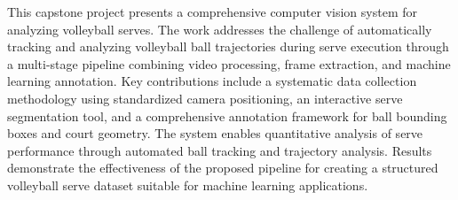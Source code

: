 This capstone project presents a comprehensive computer vision system for analyzing volleyball serves. The work addresses the challenge of automatically tracking and analyzing volleyball ball trajectories during serve execution through a multi-stage pipeline combining video processing, frame extraction, and machine learning annotation. Key contributions include a systematic data collection methodology using standardized camera positioning, an interactive serve segmentation tool, and a comprehensive annotation framework for ball bounding boxes and court geometry. The system enables quantitative analysis of serve performance through automated ball tracking and trajectory analysis. Results demonstrate the effectiveness of the proposed pipeline for creating a structured volleyball serve dataset suitable for machine learning applications.